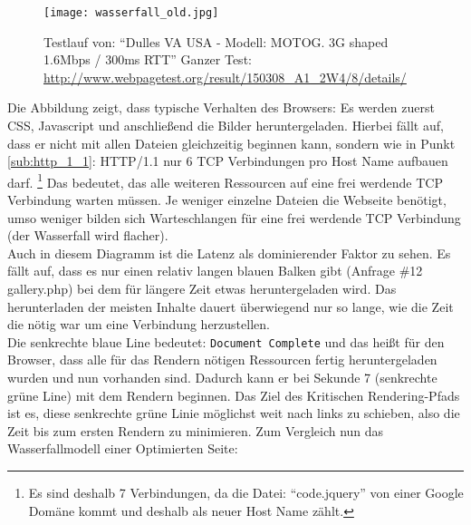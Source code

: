 		\begin{figure}[htbp]
			\begin{center}
				\texttt{[image: wasserfall\_old.jpg]}
				\caption{Testlauf von: "`Dulles VA USA - Modell: MOTOG. 3G shaped 1.6Mbps / 300ms RTT"' Ganzer Test: \url{http://www.webpagetest.org/result/150308_A1_2W4/8/details/}}
				\label{fig:wasserfall_old}
			\end{center}
		\end{figure}
		
	  Die Abbildung zeigt, dass typische Verhalten des Browsers: Es werden zuerst CSS, Javascript und anschließend die Bilder heruntergeladen. Hierbei fällt auf, dass er nicht mit allen Dateien gleichzeitig beginnen kann, sondern wie in Punkt \ref{sub:http_1_1}: HTTP/1.1 nur 6 TCP Verbindungen pro Host Name aufbauen darf. \footnote{Es sind deshalb 7 Verbindungen, da die Datei: "`code.jquery"' von einer Google Domäne kommt und deshalb als neuer Host Name zählt.} Das bedeutet, das alle weiteren Ressourcen auf eine frei werdende TCP Verbindung warten müssen. Je weniger einzelne Dateien die Webseite benötigt, umso weniger bilden sich Warteschlangen für eine frei werdende TCP Verbindung (der Wasserfall wird flacher).\\
	  Auch in diesem Diagramm ist die Latenz als dominierender Faktor zu sehen. Es fällt auf, dass es nur einen relativ langen blauen Balken gibt (Anfrage \#12 gallery.php) bei dem für längere Zeit etwas heruntergeladen wird. Das herunterladen der meisten Inhalte dauert überwiegend nur so lange, wie die Zeit die nötig war um eine Verbindung herzustellen. \\
	  Die senkrechte blaue Line bedeutet: \texttt{Document Complete} und das heißt für den Browser, dass alle für das Rendern nötigen Ressourcen fertig heruntergeladen wurden und nun vorhanden sind. Dadurch kann er bei Sekunde 7 (senkrechte grüne Line) mit dem Rendern beginnen. Das Ziel des Kritischen Rendering-Pfads ist es, diese senkrechte grüne Linie möglichst weit nach links zu schieben, also die Zeit bis zum ersten Rendern zu minimieren.
	  Zum Vergleich nun das Wasserfallmodell einer Optimierten Seite:

